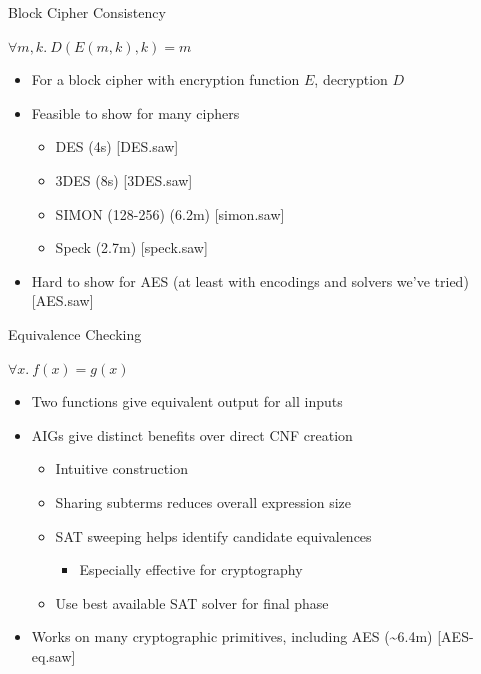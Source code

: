 \documentclass[ignorenonframetext,]{beamer}
\providecommand{\tightlist}{%
  \setlength{\itemsep}{0pt}\setlength{\parskip}{0pt}}
\newcommand{\infile}[1]{{\tiny \alert{[#1]}}}
\begin{document}
\begin{frame}{Block Cipher Consistency}

\begin{center}
$\forall m, k.~D(E(m, k), k) = m$
\end{center}

\begin{itemize}
\tightlist
\item
  For a block cipher with encryption function \(E\), decryption \(D\)
\item
  Feasible to show for many ciphers

  \begin{itemize}
  \tightlist
  \item
    DES (4s) \infile{DES.saw}
  \item
    3DES (8s) \infile {3DES.saw}
  \item
    SIMON (128-256) (6.2m) \infile{simon.saw}
  \item
    Speck (2.7m) \infile{speck.saw}
  \end{itemize}
\item
  Hard to show for AES (at least with encodings and solvers we've tried)
  \infile{AES.saw}
\end{itemize}

\end{frame}

\begin{frame}{Equivalence Checking}

\begin{center}
$\forall x.~f(x) = g(x)$
\end{center}

\begin{itemize}
\tightlist
\item
  Two functions give equivalent output for all inputs
\item
  AIGs give distinct benefits over direct CNF creation

  \begin{itemize}
  \tightlist
  \item
    Intuitive construction
  \item
    Sharing subterms reduces overall expression size
  \item
    SAT sweeping helps identify candidate equivalences

    \begin{itemize}
    \tightlist
    \item
      Especially effective for cryptography
    \end{itemize}
  \item
    Use best available SAT solver for final phase
  \end{itemize}
\item
  Works on many cryptographic primitives, including AES
  (\textasciitilde{}6.4m) \infile{AES-eq.saw}
\end{itemize}

\end{frame}
\end{document}
